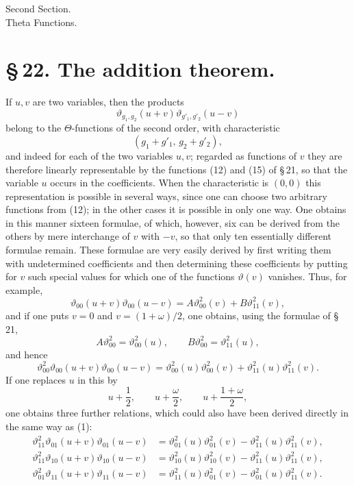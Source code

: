 \documentclass[11pt]{article}
\newcommand{\tht}{\vartheta}
\begin{document}
\begin{center}
{\large Second Section.}\\[0.7em]
{\Large Theta Functions.}
\end{center}

\section*{\S\,22. The addition theorem.}

If $u,v$ are two variables, then the products
\[
\tht_{g_1,g_2}(u+v)\tht_{g'_1,g'_2}(u-v)
\]
belong to the $\Theta$-functions of the second order, with characteristic
\[
(g_1+g'_1,\,g_2+g'_2),
\]
and indeed for each of the two variables $u,v$; regarded as functions of $v$ they are therefore linearly representable by the functions (12) and (15) of \S\,21, so that the variable $u$ occurs in the coefficients. When the characteristic is $(0,0)$ this representation is possible in several ways, since one can choose two arbitrary functions from (12); in the other cases it is possible in only one way. One obtains in this manner sixteen formulae, of which, however, six can be derived from the others by mere interchange of $v$ with $-v$, so that only ten essentially different formulae remain. These formulae are very easily derived by first writing them with undetermined coefficients and then determining these coefficients by putting for $v$ such special values for which one of the functions $\tht(v)$ vanishes. Thus, for example,
\[
\tht_{00}(u+v)\tht_{00}(u-v)=A\tht_{00}^{2}(v)+B\tht_{11}^{2}(v),
\]
and if one puts $v=0$ and $v=(1+\omega)/2$, one obtains, using the formulae of \S\,21,
\[
A\tht_{00}^{2}=\tht_{00}^{2}(u),\qquad B\tht_{00}^{2}=\tht_{11}^{2}(u),
\]
and hence
\begin{equation}
\tht_{00}^{2}\tht_{00}(u+v)\tht_{00}(u-v)
=\tht_{00}^{2}(u)\tht_{00}^{2}(v)+\tht_{11}^{2}(u)\tht_{11}^{2}(v).
\tag{1}
\end{equation}
If one replaces $u$ in this by
\[
u+\frac12,\qquad u+\frac{\omega}{2},\qquad u+\frac{1+\omega}{2},
\]
one obtains three further relations, which could also have been derived directly in the same way as (1):
\begin{align}
\tht_{11}^{2}\tht_{01}(u+v)\tht_{01}(u-v)
&=\tht_{01}^{2}(u)\tht_{01}^{2}(v)-\tht_{11}^{2}(u)\tht_{11}^{2}(v), \tag{2}\\
\tht_{11}^{2}\tht_{10}(u+v)\tht_{10}(u-v)
&=\tht_{10}^{2}(u)\tht_{10}^{2}(v)-\tht_{11}^{2}(u)\tht_{11}^{2}(v), \tag{3}\\
\tht_{01}^{2}\tht_{11}(u+v)\tht_{11}(u-v)
&=\tht_{11}^{2}(u)\tht_{01}^{2}(v)-\tht_{01}^{2}(u)\tht_{11}^{2}(v). \tag{4}
\end{align}
\end{document}

